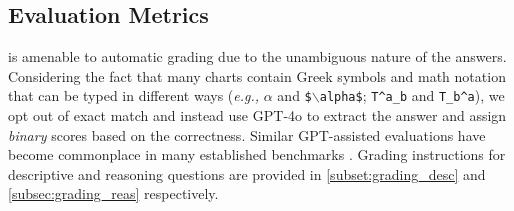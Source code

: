 \subsection{Evaluation Metrics}
\label{subsec:eval_protocol}
\ours{} is amenable to automatic grading due to the unambiguous nature of the answers. 
Considering the fact that many charts contain Greek symbols and math notation that can be typed in different ways (\textit{e.g.,} \texttt{$\alpha$} and \texttt{\$$\backslash$alpha\$}; \texttt{T\^{}a\_b} and \texttt{T\_b\^{}a}), we opt out of exact match and instead use GPT-4o \cite{openai2024gpt4} to extract the answer and assign \textit{binary} scores based on the correctness.
Similar GPT-assisted evaluations have become commonplace in many established benchmarks \cite{lu2024mathvista, yu2023mm, dubois2024alpacafarm}.
Grading instructions for descriptive and reasoning questions are provided in \cref{subset:grading_desc} and \cref{subsec:grading_reas} respectively.
